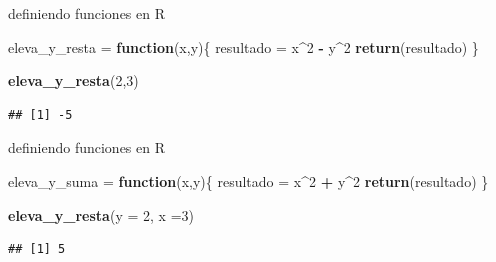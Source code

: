 \documentclass[ignorenonframetext,]{beamer}
\newenvironment{Shaded}{\begin{snugshade}}{\end{snugshade}}
\newcommand{\ControlFlowTok}[1]{\textcolor[rgb]{0.13,0.29,0.53}{\textbf{#1}}}
\newcommand{\DataTypeTok}[1]{\textcolor[rgb]{0.13,0.29,0.53}{#1}}
\newcommand{\DecValTok}[1]{\textcolor[rgb]{0.00,0.00,0.81}{#1}}
\newcommand{\KeywordTok}[1]{\textcolor[rgb]{0.13,0.29,0.53}{\textbf{#1}}}
\newcommand{\NormalTok}[1]{#1}
\newcommand{\OperatorTok}[1]{\textcolor[rgb]{0.81,0.36,0.00}{\textbf{#1}}}
\newcommand{\StringTok}[1]{\textcolor[rgb]{0.31,0.60,0.02}{#1}}
\begin{document}
\begin{frame}[fragile]{definiendo funciones en R}
\protect\hypertarget{definiendo-funciones-en-r-2}{}

\begin{Shaded}
\begin{Highlighting}[]
\NormalTok{eleva_y_resta =}\StringTok{ }\ControlFlowTok{function}\NormalTok{(x,y)\{}
\NormalTok{  resultado =}\StringTok{ }\NormalTok{x}\OperatorTok{^}\DecValTok{2} \OperatorTok{-}\StringTok{ }\NormalTok{y}\OperatorTok{^}\DecValTok{2}
  \KeywordTok{return}\NormalTok{(resultado)}
\NormalTok{\}}

\KeywordTok{eleva_y_resta}\NormalTok{(}\DecValTok{2}\NormalTok{,}\DecValTok{3}\NormalTok{)}
\end{Highlighting}
\end{Shaded}

\begin{verbatim}
## [1] -5
\end{verbatim}

\end{frame}

\begin{frame}[fragile]{definiendo funciones en R}
\protect\hypertarget{definiendo-funciones-en-r-3}{}

\begin{Shaded}
\begin{Highlighting}[]
\NormalTok{eleva_y_suma =}\StringTok{ }\ControlFlowTok{function}\NormalTok{(x,y)\{}
\NormalTok{  resultado =}\StringTok{ }\NormalTok{x}\OperatorTok{^}\DecValTok{2} \OperatorTok{+}\StringTok{ }\NormalTok{y}\OperatorTok{^}\DecValTok{2}
  \KeywordTok{return}\NormalTok{(resultado)}
\NormalTok{\}}

\KeywordTok{eleva_y_resta}\NormalTok{(}\DataTypeTok{y =} \DecValTok{2}\NormalTok{, }\DataTypeTok{x =}\DecValTok{3}\NormalTok{)}
\end{Highlighting}
\end{Shaded}

\begin{verbatim}
## [1] 5
\end{verbatim}

\end{frame}
\end{document}
